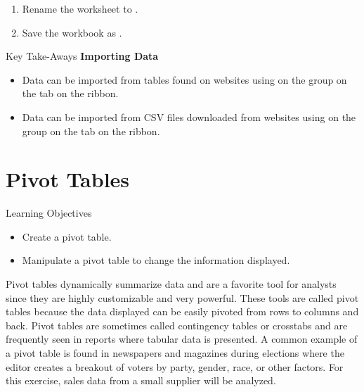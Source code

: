 \begin{enumerate}[resume]
	\item Rename the worksheet to .
	\item Save the workbook as .
\end{enumerate}

\begin{center}
	\begin{tkwbox}{Key Take-Aways}
		\textbf{Importing Data}
		\\
		\begin{itemize}
			\setlength{\itemsep}{0pt}
			\setlength{\parskip}{0pt}
			\setlength{\parsep}{0pt}
			
			\item Data can be imported from tables found on websites using  on the  group on the  tab on the ribbon.
			\item Data can be imported from CSV files downloaded from websites using  on the  group on the  tab on the ribbon.
			
		\end{itemize}
	\end{tkwbox}
\end{center}

\section{Pivot Tables}

\begin{center}
	\begin{objbox}{Learning Objectives}
		\begin{itemize}
			\setlength{\itemsep}{0pt}
			\setlength{\parskip}{0pt}
			\setlength{\parsep}{0pt}

			\item Create a pivot table.
			\item Manipulate a pivot table to change the information displayed.
			
		\end{itemize}
	\end{objbox}
\end{center}

Pivot tables dynamically summarize data and are a favorite tool for analysts since they are highly customizable and very powerful. These tools are called pivot tables because the data displayed can be easily pivoted from rows to columns and back. Pivot tables are sometimes called contingency tables or crosstabs and are frequently seen in reports where tabular data is presented. A common example of a pivot table is found in newspapers and magazines during elections where the editor creates a breakout of voters by party, gender, race, or other factors. For this exercise, sales data from a small supplier will be analyzed.

